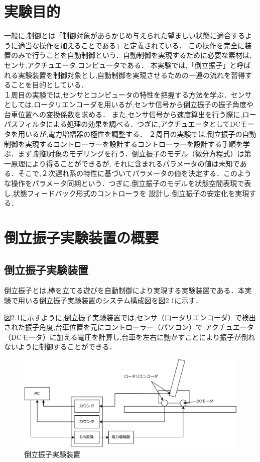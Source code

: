 
\section{実験目的}
一般に,制御とは「制御対象があらかじめ与えられた望ましい状態に適合するように適当な操作を加えることである」と定義されている．
この操作を完全に装置のみで行うことを自動制御という．自動制御を実現するために必要な素材は,センサ,アクチュエータ,コンピュータである．
本実験では,「倒立振子」と呼ばれる実験装置を制御対象とし,自動制御を実現させるための一連の流れを習得することを目的としている．\\
\quad １周目の実験では,センサとコンピュータの特性を把握する方法を学ぶ．センサとしては,ロータリエンコーダを用いるが,センサ信号から倒立振子の振子角度や台車位置への変換係数を求める．
また,センサ信号から速度算出を行う際に,ローパスフィルタによる処理の効果を調べる．つぎに,アクチュエータとしてDCモータを用いるが,電力増幅器の極性を調整する．
\quad ２周目の実験では,倒立振子の自動制御を実現するコントローラーを設計するコントローラーを設計する手順を学ぶ．まず,制御対象のモデリングを行う．倒立振子のモデル（微分方程式）は第一原理により得ることができるが,
それに含まれるパラメータの値は未知である．そこで,２次遅れ系の特性に基づいてパラメータの値を決定する．このような操作をパラメータ同期という．つぎに,倒立振子のモデルを状態空間表現で表し,状態フィードバック形式のコントローラを
設計し,倒立振子の安定化を実現する．

\section{倒立振子実験装置の概要}
\subsection{倒立振子実験装置}
倒立振子とは,棒を立てる遊びを自動制御により実現する実験装置である．本実験で用いる倒立振子実験装置のシステム構成図を図2.1に示す．

\quad 図2.1に示すように,倒立振子実験装置では,センサ（ロータリエンコーダ）で検出された振子角度,台車位置を元にコントローラー（パソコン）で
アクチュエータ（DCモータ）に加える電圧を計算し,台車を左右に動かすことにより振子が倒れないように制御することができる．

\begin{figure}[H]
  \centering
  \includegraphics[scale=0.8]{sozai/touritu.pdf}
  \caption{倒立振子実験装置}
\end{figure}

